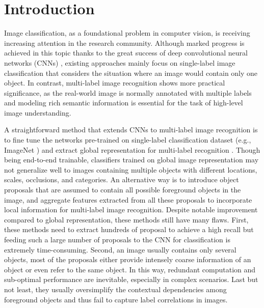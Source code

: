 \documentclass[letterpaper]{article} %
\begin{document}
\section{Introduction}
Image classification, as a foundational problem in computer vision, is receiving increasing attention in the research community. Although marked progress is achieved in this topic thanks to the great success of deep convolutional neural networks (CNNs) \cite{krizhevsky2012imagenet,he2016deep}, existing approaches mainly focus on single-label image classification that considers the situation where an image would contain only one object. In contrast, multi-label image recognition shows more practical significance, as the real-world image is normally annotated with multiple labels and modeling rich semantic information is essential for the task of high-level image understanding.

A straightforward method that extends CNNs to multi-label image recognition is to fine tune the networks pre-trained on single-label classification dataset (e.g.,  ImageNet \cite{russakovsky2015imagenet}) and extract global representation for multi-label recognition \cite{chatfield2014return}. Though being end-to-end trainable, classifiers trained on global image representation may not generalize well to images containing multiple objects with different locations, scales, occlusions, and categories. An alternative way \cite{yang2016exploit,wei2016hcp} is to introduce object proposals that are assumed to contain all possible foreground objects in the image, and aggregate features extracted from all these proposals to incorporate local information for multi-label image recognition. Despite notable improvement compared to global representation, these methods still have many flaws. First, these methods need to extract hundreds of proposal to achieve a high recall but feeding such a large number of proposals to the CNN for classification is extremely time-consuming. Second, an image usually contains only several objects, most of the proposals either provide intensely coarse information of an object or even refer to the same object. In this way, redundant computation and sub-optimal performance are inevitable, especially in complex scenarios. Last but not least, they usually oversimplify the contextual dependencies among foreground objects and thus fail to capture label correlations in images. 
\end{document}
